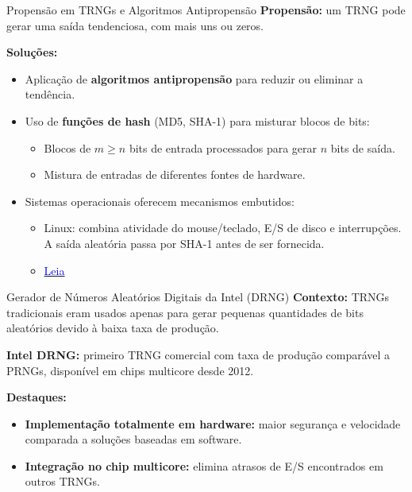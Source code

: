 \begin{frame}{Propensão em TRNGs e Algoritmos Antipropensão}
\textbf{Propensão:} um TRNG pode gerar uma saída tendenciosa, com mais uns ou zeros.

\textbf{Soluções:}
\begin{itemize}
    \item Aplicação de \textbf{algoritmos antipropensão} para reduzir ou eliminar a tendência.
    \item Uso de \textbf{funções de hash} (MD5, SHA-1) para misturar blocos de bits:
        \begin{itemize}
            \item Blocos de $m \ge n$ bits de entrada processados para gerar $n$ bits de saída.
            \item Mistura de entradas de diferentes fontes de hardware.
        \end{itemize}
    \item Sistemas operacionais oferecem mecanismos embutidos:
        \begin{itemize}
            \item Linux: combina atividade do mouse/teclado, E/S de disco e interrupções. A saída aleatória passa por SHA-1 antes de ser fornecida.

            \item \href{https://man.archlinux.org/man/urandom.4.en}{\textcolor{blue}{Leia}}
        \end{itemize}
\end{itemize}

\end{frame}

\begin{frame}{Gerador de Números Aleatórios Digitais da Intel (DRNG)}
\textbf{Contexto:} TRNGs tradicionais eram usados apenas para gerar pequenas quantidades de bits aleatórios devido à baixa taxa de produção.

\textbf{Intel DRNG:} primeiro TRNG comercial com taxa de produção comparável a PRNGs, disponível em chips multicore desde 2012.

\textbf{Destaques:}
\begin{itemize}
    \item \textbf{Implementação totalmente em hardware:} maior segurança e velocidade comparada a soluções baseadas em software.
    \item \textbf{Integração no chip multicore:} elimina atrasos de E/S encontrados em outros TRNGs.
\end{itemize}

\end{frame}

